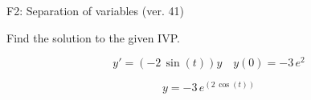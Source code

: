 \begin{exercise}
  \begin{exerciseTitle}F2: Separation of variables (ver. 41)\end{exerciseTitle}
  \begin{exerciseStatement}
    
Find the solution to the given IVP.

    
\[y'=( -2 \, \sin\left(t\right) )y\hspace{1em} y(0)= -3 \, e^{2}\]

  \end{exerciseStatement}
  \begin{exerciseAnswer}
    
\[y= -3 \, e^{\left(2 \, \cos\left(t\right)\right)}\]

  \end{exerciseAnswer}
\end{exercise}